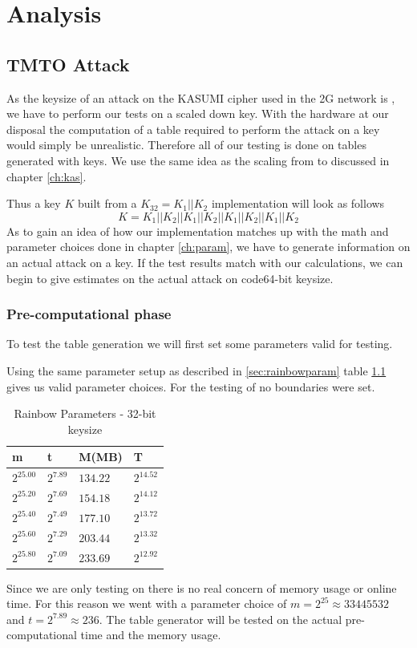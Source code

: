 \chapter{Analysis}
\label{ch:anal}

\section{TMTO Attack}
As the keysize of an attack on the KASUMI cipher used in the 2G
network is , we have to perform our tests on a scaled down
key. With the hardware at our disposal the computation of a table
required to perform the attack on a  key would simply be
unrealistic. Therefore all of our testing is done on tables generated
with  keys. We use the same idea as the scaling from  to
 discussed in chapter \ref{ch:kas}.

Thus a key $K$ built from a  $K_{32} = K_1 || K_2$  implementation will
look as follows
\[K = K_1 || K_2 || K_1 || K_2 || K_1 || K_2 || K_1 || K_2\]
As to gain an idea of how our implementation matches up with
the math and parameter choices done in chapter \ref{ch:param}, we have to generate
information on an actual attack on a  key. If the  test
results match with our calculations, we can begin to give estimates
on the actual attack on code{64-bit} keysize.
\subsection{Pre-computational phase}
To test the table generation we will first set some parameters
valid for  testing.

Using the same parameter setup as described in \ref{sec:rainbowparam}
table \ref{tab:rainparam32} gives us valid parameter choices. For the
testing of  no boundaries were set.
\begin{table}[H]
  \centering
  \begin{tabular}{llll}
    m & t & M(MB) & T \\ \hline
    $2^{25.00}$ & $2^{7.89}$ & $134.22$ & $2^{14.52}$ \\
    $2^{25.20}$ & $2^{7.69}$ & $154.18$ & $2^{14.12}$ \\
    $2^{25.40}$ & $2^{7.49}$ & $177.10$ & $2^{13.72}$ \\
    $2^{25.60}$ & $2^{7.29}$ & $203.44$ & $2^{13.32}$ \\
    $2^{25.80}$ & $2^{7.09}$ & $233.69$ & $2^{12.92}$ \\
  \end{tabular}
  \caption{Rainbow Parameters - 32-bit keysize}
  \label{tab:rainparam32}
\end{table}
Since we are only testing on  there is no real concern of
memory usage or online time. For this reason we went with a parameter
choice of $m=2^{25} \approx 33445532$ and $t= 2^{7.89} \approx
236$. The table generator will be tested on the actual
pre-computational time and the memory usage.
